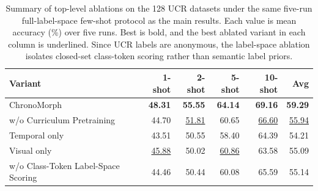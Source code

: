 \begin{table}[t]
\centering
\caption{Summary of top-level ablations on the 128 UCR datasets under the same five-run full-label-space few-shot protocol as the main results. Each value is mean accuracy (\%) over five runs. Best is bold, and the best ablated variant in each column is underlined. Since UCR labels are anonymous, the label-space ablation isolates closed-set class-token scoring rather than semantic label priors.}
\label{tab:ablation-summary}
\begin{tabular}{lrrrrr}
\toprule
Variant & 1-shot & 2-shot & 5-shot & 10-shot & Avg \\
\midrule
ChronoMorph & \textbf{48.31} & \textbf{55.55} & \textbf{64.14} & \textbf{69.16} & \textbf{59.29} \\
\midrule
w/o Curriculum Pretraining & 44.70 & \underline{51.81} & 60.65 & \underline{66.60} & \underline{55.94} \\
Temporal only & 43.51 & 50.55 & 58.40 & 64.39 & 54.21 \\
Visual only & \underline{45.88} & 50.02 & \underline{60.86} & 63.58 & 55.09 \\
w/o Class-Token Label-Space Scoring & 44.46 & 50.44 & 60.08 & 65.59 & 55.14 \\
\bottomrule
\end{tabular}
\end{table}
